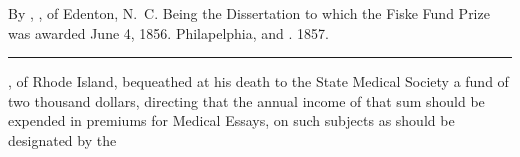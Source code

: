   By , \md, of Edenton, N.~C. Being the Dissertation to which the Fiske Fund Prize was awarded June 4, 1856. Philapelphia,  and . 1857.
\plainbreak{1}

\normalsize

, of Rhode Island, bequeathed at his death to the
State Medical Society a fund of two thousand dollars, directing that
the annual income of that sum should be expended in premiums for
Medical Essays, on such subjects as should be designated by the\endinput
